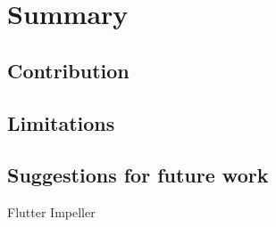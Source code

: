 
\chapter{Summary}

\section{Contribution}

\section{Limitations}

\section{Suggestions for future work}
Flutter Impeller
